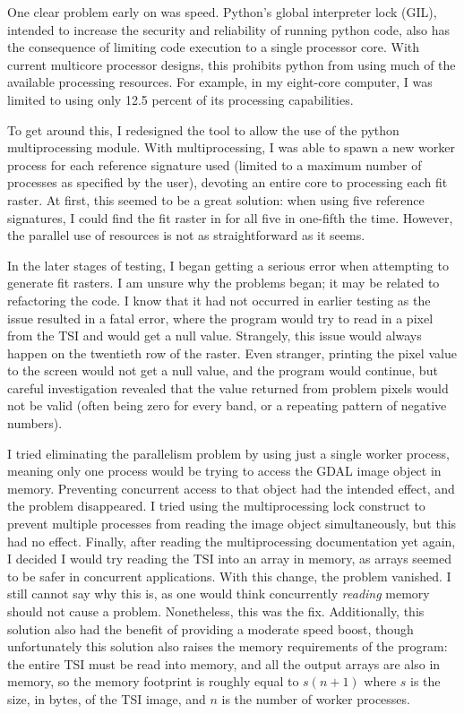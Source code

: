 One clear problem early on was speed. Python’s global interpreter lock (GIL), intended to increase the security and reliability of running python code, also has the consequence of limiting code execution to a single processor core. With current multicore processor designs, this prohibits python from using much of the available processing resources. For example, in my eight-core computer, I was limited to using only 12.5 percent of its processing capabilities.

To get around this, I redesigned the tool to allow the use of the python multiprocessing module. With multiprocessing, I was able to spawn a new worker process for each reference signature used (limited to a maximum number of processes as specified by the user), devoting an entire core to processing each fit raster. At first, this seemed to be a great solution: when using five reference signatures, I could find the fit raster in for all five in one-fifth the time. However, the parallel use of resources is not as straightforward as it seems.

In the later stages of testing, I began getting a serious error when attempting to generate fit rasters. I am unsure why the problems began; it may be related to refactoring the code. I know that it had not occurred in earlier testing as the issue resulted in a fatal error, where the program would try to read in a pixel from the TSI and would get a null value. Strangely, this issue would always happen on the twentieth row of the raster. Even stranger, printing the pixel value to the screen would not get a null value, and the program would continue, but careful investigation revealed that the value returned from problem pixels would not be valid (often being zero for every band, or a repeating pattern of negative numbers).

I tried eliminating the parallelism problem by using just a single worker process, meaning only one process would be trying to access the GDAL image object in memory. Preventing concurrent access to that object had the intended effect, and the problem disappeared. I tried using the multiprocessing lock construct to prevent multiple processes from reading the image object simultaneously, but this had no effect. Finally, after reading the multiprocessing documentation yet again, I decided I would try reading the TSI into an array in memory, as arrays seemed to be safer in concurrent applications. With this change, the problem vanished. I still cannot say why this is, as one would think concurrently \textit{reading} memory should not cause a problem. Nonetheless, this was the fix. Additionally, this solution also had the benefit of providing a moderate speed boost, though unfortunately this solution also raises the memory requirements of the program: the entire TSI must be read into memory, and all the output arrays are also in memory, so the memory footprint is roughly equal to $s(n + 1)$ where $s$ is the size, in bytes, of the TSI image, and $n$ is the number of worker processes.

